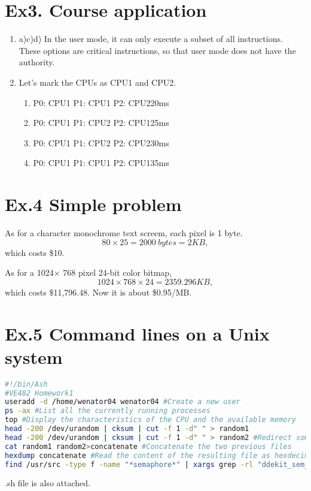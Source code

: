 \documentclass[a4paper]{article}
\begin{document}
\section*{Ex3. Course application}
	\begin{enumerate}
		\item a)c)d) In the user mode, it can only execute a subset of all instructions. These options are critical instructions, so that user mode does not have the authority.
		\item Let's mark the CPUs as CPU1 and CPU2.
		\begin{enumerate}
			\item P0: CPU1 P1: CPU1 P2: CPU2\quad 20ms
			\item P0: CPU1 P1: CPU2 P2: CPU1\quad 25ms
			\item P0: CPU1 P1: CPU2 P2: CPU2\quad 30ms
			\item P0: CPU1 P1: CPU1 P2: CPU1\quad 35ms
		\end{enumerate}
	\end{enumerate}

\section*{Ex.4 Simple problem}
	As for a character monochrome text screem, each pixel is 1 byte.
	$$80\times 25 = 2000\ bytes = 2KB,$$
	which costs \$10.\par
	As for a 1024$\times$ 768 pixel 24-bit color bitmap,
	$$1024\times768\times24=2359.296KB,$$
	which costs \$11,796.48. Now it is about \$0.95/MB.

\section*{Ex.5 Command lines on a Unix system}
\begin{lstlisting}[language=bash]
#!/bin/Ash
#VE482 Homework1
useradd -d /home/wenator04 wenator04 #Create a new user
ps -ax #List all the currently running processes
top #Display the characteristics of the CPU and the available memory
head -200 /dev/urandom | cksum | cut -f 1 -d" " > random1
head -200 /dev/urandom | cksum | cut -f 1 -d" " > random2 #Redirect some random output into two different files
cat random1 random2>concatenate #Concatenate the two previous files
hexdump concatenate #Read the content of the resulting file as hexdecimal values
find /usr/src -type f -name "*semaphore*" | xargs grep -rl "ddekit_sem_down" #Use a single command to find all the files in /usr/src with the word semaphore in their name and containing the word ddekit_sem_down
\end{lstlisting}
.sh file is also attached.
\end{document}
